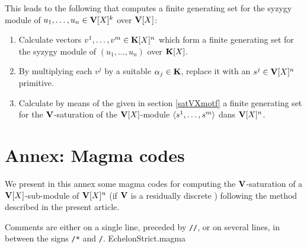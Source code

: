 This leads to  the following \algo that computes a finite  generating set for the syzygy module of $u_1,\dots,u_n\in\mathbf{V}[X]^k$ over $\mathbf{V}[X]$:
%
\begin{enumerate}
%
\item Calculate vectors  $v^1,\dots,v^m\in\mathbf{K}[X]^n$ which form a finite generating set for the syzygy module of $(u_1,\dots,u_n)$ over $\mathbf{K}[X]$.
%
\item By multiplying each $v^j$ by a suitable $\alpha_j\in\mathbf{K}$, replace it with an $s^j\in\mathbf{V}[X]^n$ primitive.
%
\item Calculate by means of the \algo given in section \ref{satVXmotf} a finite generating set for 
the $\mathbf{V}$-saturation of the $\mathbf{V}[X]$-module  $\langle{s^1,\dots,s^m}\rangle$ dans $\mathbf{V}[X]^n$.
%
\end{enumerate}




\section{Annex:  Magma codes} \label{code}


We present in this annex some  magma codes for computing  the
 $\mathbf{V}$-saturation of a \tf $\mathbf{V}[X]$-sub-module of $\mathbf{V}[X]^{n}$
 (if $\mathbf{V}$ is a residually discrete \ddv) following the method described in the present article.

\smallskip Comments are  either on  a single line, preceded by {\tt //},
or on several lines, in between the signs {\tt /*} and {\tt */}.
\newpage
{\small  {EchelonStrict.magma}
}




